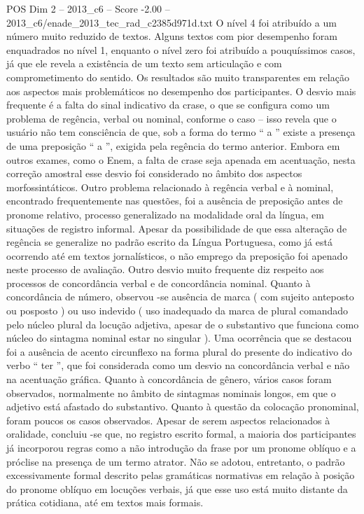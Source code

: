\begin{textsample}{POS Dim 2 – 2013\_c6 – Score -2.00 – 2013\_c6/enade\_2013\_tec\_rad\_c2385d971d.txt}
O nível 4 foi atribuído a um número muito reduzido de textos.
Alguns textos com pior desempenho foram enquadrados no nível 1, enquanto o nível zero foi atribuído a pouquíssimos casos, já que ele revela a existência de um texto sem articulação e com comprometimento do sentido.
Os resultados são muito transparentes em relação aos aspectos mais problemáticos no desempenho dos participantes.
O desvio mais frequente é a falta do sinal indicativo da crase, o que se configura como um problema de regência, verbal ou nominal, conforme o caso – isso revela que o usuário não tem consciência de que, sob a forma do termo “ a ” existe a presença de uma preposição “ a ”, exigida pela regência do termo anterior.
Embora em outros exames, como o Enem, a falta de crase seja apenada em acentuação, nesta correção amostral esse desvio foi considerado no âmbito dos aspectos morfossintáticos.
Outro problema relacionado à regência verbal e à nominal, encontrado frequentemente nas questões, foi a ausência de preposição antes de pronome relativo, processo generalizado na modalidade oral da língua, em situações de registro informal.
Apesar da possibilidade de que essa alteração de regência se generalize no padrão escrito da Língua Portuguesa, como já está ocorrendo até em textos jornalísticos, o não emprego da preposição foi apenado neste processo de avaliação.
Outro desvio muito frequente diz respeito aos processos de concordância verbal e de concordância nominal.
Quanto à concordância de número, observou -se ausência de marca ( com sujeito anteposto ou posposto ) ou uso indevido ( uso inadequado da marca de plural comandado pelo núcleo plural da locução adjetiva, apesar de o substantivo que funciona como núcleo do sintagma nominal estar no singular ).
Uma ocorrência que se destacou foi a ausência de acento circunflexo na forma plural do presente do indicativo do verbo “ ter ”, que foi considerada como um desvio na concordância verbal e não na acentuação gráfica.
Quanto à concordância de gênero, vários casos foram observados, normalmente no âmbito de sintagmas nominais longos, em que o adjetivo está afastado do substantivo.
Quanto à questão da colocação pronominal, foram poucos os casos observados.
Apesar de serem aspectos relacionados à oralidade, concluiu -se que, no registro escrito formal, a maioria dos participantes já incorporou regras como a não introdução da frase por um pronome oblíquo e a próclise na presença de um termo atrator.
Não se adotou, entretanto, o padrão excessivamente formal descrito pelas gramáticas normativas em relação à posição do pronome oblíquo em locuções verbais, já que esse uso está muito distante da prática cotidiana, até em textos mais formais.

\end{textsample}
